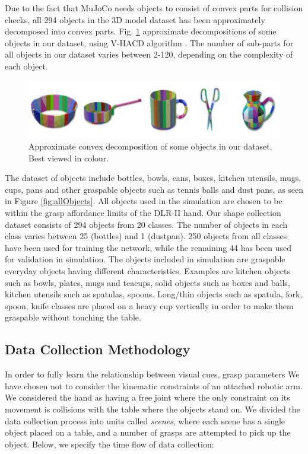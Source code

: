 Due to the fact that MuJoCo needs objects to consist of convex parts for collision checks, all 294 objects in the 3D model dataset has been approximately decomposed into convex parts. Fig. \ref{fig:objectDecomposition} approximate decompositions of some objects in our dataset, using V-HACD algorithm \cite{V-HACD}. The number of sub-parts for all objects in our dataset varies between 2-120, depending on the complexity of each object. 

\begin{figure}
  \includegraphics[width=\linewidth]{images/decomposition.png}
  \caption{Approximate convex decomposition of some objects in our dataset. Best viewed in colour.}
  \label{fig:objectDecomposition}
\end{figure}

The dataset of objects include bottles, bowls, cans, boxes, kitchen utensils, mugs, cups, pans and other graspable objects such as tennis balls and dust pans, as seen in Figure \ref{fig:allObjects}. All objects used in the simulation are chosen to be within the grasp affordance limits of the DLR-II hand. Our shape collection dataset consists of 294 objects from 20 classes. The number of objects in each class varies between 25 (bottles) and 1 (dustpan). 250 objects from all classes have been used for training the network, while the remaining 44 has been used for validation in simulation. The objects included in simulation are graspable everyday objects having different characteristics. Examples are kitchen objects such as bowls, plates, mugs and teacups, solid objects such as boxes and balls, kitchen utensils such as spatulas, spoons. Long/thin objects such as spatula, fork, spoon, knife classes are placed on a heavy cup vertically in order to make them graspable without touching the table. 

\subsection{Data Collection Methodology}
\label{subsection:dataCollection}

In order to fully learn the relationship between visual cues, grasp parameters We have chosen not to consider the kinematic constraints of an attached robotic arm. We considered the hand as having a free joint where the only constraint on its movement is collisions with the table where the objects stand on. We divided the data collection process into units called \textit{scenes}, where each scene has a single object placed on a table, and a number of grasps are attempted to pick up the object. Below, we specify the time flow of data collection:

